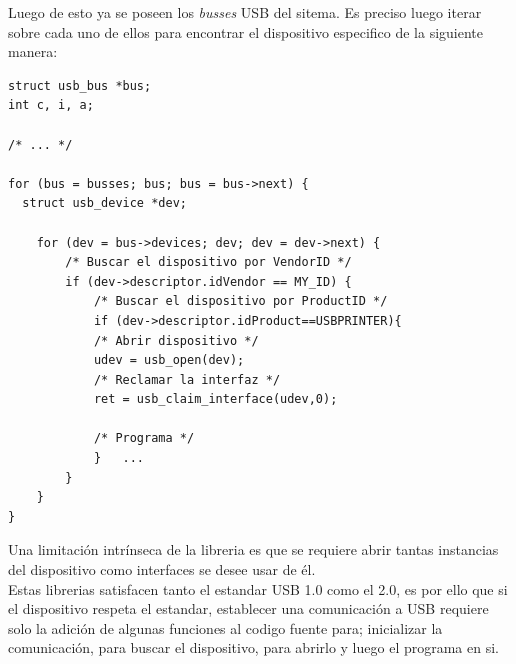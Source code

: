 Luego de esto ya se poseen los \emph{busses} USB del sitema. Es preciso luego
iterar sobre cada uno de ellos para encontrar el dispositivo especifico de la
siguiente manera:

\begin{footnotesize}
\begin{verbatim}
struct usb_bus *bus;
int c, i, a;
    
/* ... */
    
for (bus = busses; bus; bus = bus->next) {
  struct usb_device *dev;
    
    for (dev = bus->devices; dev; dev = dev->next) {
        /* Buscar el dispositivo por VendorID */
        if (dev->descriptor.idVendor == MY_ID) {
            /* Buscar el dispositivo por ProductID */
            if (dev->descriptor.idProduct==USBPRINTER){
            /* Abrir dispositivo */
            udev = usb_open(dev);
            /* Reclamar la interfaz */
            ret = usb_claim_interface(udev,0); 

            /* Programa */
            }	...
        }
    }
}
\end{verbatim}
\end{footnotesize}

Una limitaci\'on intr\'inseca de la libreria es que se requiere abrir tantas
instancias del dispositivo como interfaces se desee usar de \'el.\\

Estas librerias satisfacen tanto el estandar USB 1.0 como el 2.0, es por ello
que si el dispositivo respeta el estandar, establecer una comunicaci\'on a
USB requiere solo la adici\'on de algunas funciones al codigo fuente para;
inicializar la comunicaci\'on, para buscar el dispositivo, para abrirlo y
luego el programa en si.

